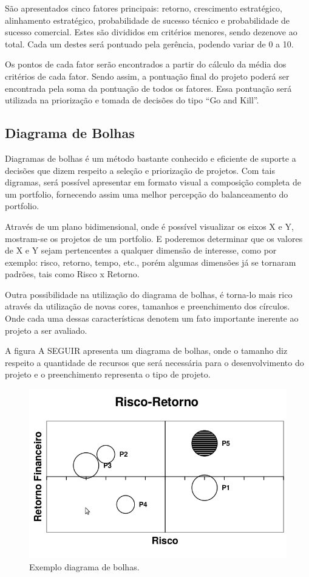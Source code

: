 \documentclass[12pt,a4paper,ruledheader,tocpage=prefix,floatnumber=continuous,pagestart=folhaderosto,font=times]{abnt}
\begin{document}
São apresentados cinco fatores principais: retorno, crescimento estratégico, alinhamento estratégico, probabilidade de sucesso técnico e probabilidade de
sucesso comercial. Estes são divididos em critérios menores, sendo dezenove ao total. Cada um destes será pontuado pela gerência, podendo variar de 0 a 10.

Os pontos de cada fator serão encontrados a partir do cálculo da média dos critérios de cada fator. Sendo assim, a pontuação final do projeto poderá ser 
encontrada pela soma da pontuação de todos os fatores. Essa pontuação será utilizada na priorização e tomada de decisões do tipo ``Go and Kill''.

\subsection{Diagrama de Bolhas}
Diagramas de bolhas é um método bastante conhecido e eficiente de suporte a decisões que dizem respeito a seleção e priorização de projetos. Com tais
digramas, será possível apresentar em formato visual a composição completa de um portfolio, fornecendo assim uma melhor percepção do balanceamento do
portfolio. \cite{cooper2}

Através de um plano bidimensional, onde é possível visualizar os eixos X e Y, mostram-se os projetos de um portfolio. E poderemos determinar que os 
valores de X e Y sejam pertencentes a qualquer dimensão de interesse, como por exemplo: risco, retorno, tempo, etc., porém algumas dimensões já se 
tornaram padrões, tais como Risco x Retorno.\cite{cooper}

Outra possibilidade na utilização do diagrama de bolhas, é torna-lo mais rico através da utilização de novas cores, tamanhos e preenchimento dos círculos.
Onde cada uma dessas características denotem um fato importante inerente ao projeto a ser avaliado.

A figura A SEGUIR apresenta um diagrama de bolhas, onde o tamanho diz respeito a quantidade de recursos que será necessária para o desenvolvimento do projeto
e o preenchimento representa o tipo de projeto.

\begin{figure}[H]
\centering
\includegraphics[width=.9\textwidth]{diagrama_bolhas.png}
\caption{Exemplo diagrama de bolhas\cite{cooper}.}
\end{figure} 
\end{document}
